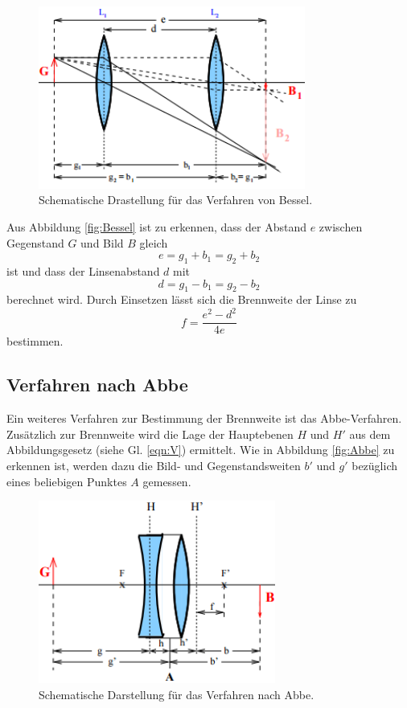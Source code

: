 \begin{figure}[H]
	\centering
	\includegraphics[height=6cm]{picture/Bessel}
	\caption{Schematische Drastellung für das Verfahren von Bessel. \cite[4]{sample}}
	\label{fig:Bessel}
\end{figure}

Aus Abbildung \eqref{fig:Bessel} ist zu erkennen, dass der Abstand $e$ zwischen Gegenstand $G$ und Bild $B$ gleich
\begin{equation*}
	e = g_1 + b_1 = g_2 + b_2
\end{equation*}
ist und dass der Linsenabstand $d$ mit
\begin{equation*}
	d = g_1 - b_1 = g_2 - b_2
\end{equation*}
berechnet wird. Durch Einsetzen lässt sich die Brennweite der Linse zu
\begin{equation}
	f = \frac{e^2 - d^2}{4e}
\end{equation}
bestimmen.

\subsection{Verfahren nach Abbe}
Ein weiteres Verfahren zur Bestimmung der Brennweite ist das Abbe-Verfahren. Zusätzlich zur Brennweite wird die Lage der Hauptebenen $H$ und $H'$ aus dem Abbildungsgesetz (siehe Gl. \eqref{eqn:V}) ermittelt. Wie in Abbildung \eqref{fig:Abbe} zu erkennen ist, werden dazu die Bild- und Gegenstandsweiten $b'$ und $g'$ bezüglich eines beliebigen Punktes $A$ gemessen.

\begin{figure}[H]
	\centering
	\includegraphics[height=6cm]{picture/Abbe}
	\caption{Schematische Darstellung für das Verfahren nach Abbe. \cite[5]{sample}}
	\label{fig:Abbe}
\end{figure}


